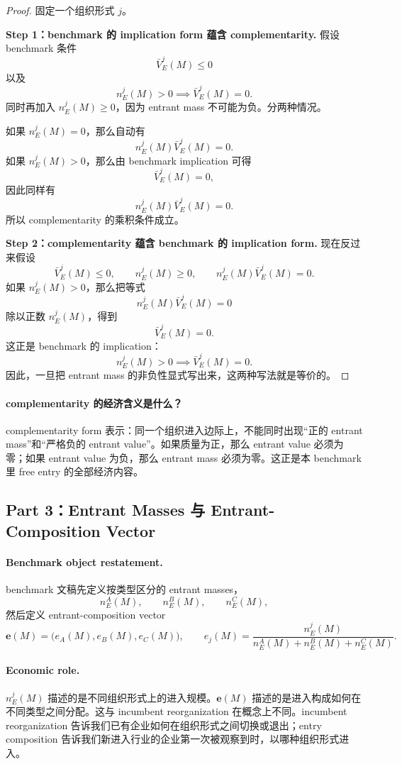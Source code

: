 \begin{proof}
固定一个组织形式 $j$。

\medskip\noindent\textbf{Step 1：benchmark 的 implication form 蕴含 complementarity.}
假设 benchmark 条件
\[
\bar V_E^j(M)\le 0
\]
以及
\[
n_E^j(M)>0\implies \bar V_E^j(M)=0.
\]
同时再加入 $n_E^j(M)\ge 0$，因为 entrant mass 不可能为负。分两种情况。

如果 $n_E^j(M)=0$，那么自动有
\[
n_E^j(M)\bar V_E^j(M)=0.
\]
如果 $n_E^j(M)>0$，那么由 benchmark implication 可得
\[
\bar V_E^j(M)=0,
\]
因此同样有
\[
n_E^j(M)\bar V_E^j(M)=0.
\]
所以 complementarity 的乘积条件成立。

\medskip\noindent\textbf{Step 2：complementarity 蕴含 benchmark 的 implication form.}
现在反过来假设
\[
\bar V_E^j(M)\le 0,\qquad n_E^j(M)\ge 0,\qquad n_E^j(M)\bar V_E^j(M)=0.
\]
如果 $n_E^j(M)>0$，那么把等式
\[
n_E^j(M)\bar V_E^j(M)=0
\]
除以正数 $n_E^j(M)$，得到
\[
\bar V_E^j(M)=0.
\]
这正是 benchmark 的 implication：
\[
n_E^j(M)>0\implies \bar V_E^j(M)=0.
\]
因此，一旦把 entrant mass 的非负性显式写出来，这两种写法就是等价的。
\end{proof}

\paragraph{complementarity 的经济含义是什么？}
complementarity form 表示：同一个组织进入边际上，不能同时出现“正的 entrant mass”和“严格负的 entrant value”。如果质量为正，那么 entrant value 必须为零；如果 entrant value 为负，那么 entrant mass 必须为零。这正是本 benchmark 里 free entry 的全部经济内容。

\subsection{Part 3：Entrant Masses 与 Entrant-Composition Vector}

\paragraph{Benchmark object restatement.}
benchmark 文稿先定义按类型区分的 entrant masses，
\[
n_E^A(M),\qquad n_E^B(M),\qquad n_E^C(M),
\]
然后定义 entrant-composition vector
\[
\mathbf e(M)=\bigl(e_A(M),e_B(M),e_C(M)\bigr),
\qquad
e_j(M)=\frac{n_E^j(M)}{n_E^A(M)+n_E^B(M)+n_E^C(M)}.
\]

\paragraph{Economic role.}
$n_E^j(M)$ 描述的是不同组织形式上的进入规模。$\mathbf e(M)$ 描述的是进入构成如何在不同类型之间分配。这与 incumbent reorganization 在概念上不同。incumbent reorganization 告诉我们已有企业如何在组织形式之间切换或退出；entry composition 告诉我们新进入行业的企业第一次被观察到时，以哪种组织形式进入。

